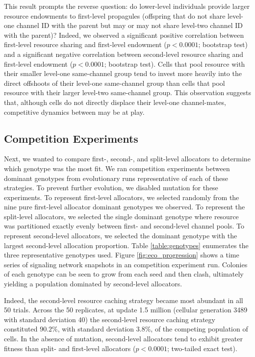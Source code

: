 This result prompts the reverse question: do lower-level individuals provide  larger resource endowments to first-level propagules (offspring that do not share level-one channel ID with the parent but may or may not share level-two channel ID with the parent)?
Indeed, we observed a significant positive correlation between first-level resource sharing and first-level endowment ($p < 0.0001$; bootstrap test) and a significant negative correlation between second-level resource sharing and first-level endowment ($p < 0.0001$; bootstrap test).
Cells that pool resource with their smaller level-one same-channel group tend to invest more heavily into the direct offshoots of their level-one same-channel group than cells that pool resource with their larger level-two same-channel group.
This observation suggests that, although cells do not directly displace their level-one channel-mates, competitive dynamics between may be at play.

\subsection{Competition Experiments}



Next, we wanted to compare first-, second-, and split-level allocators to determine which genotype was the most fit.
We ran competition experiments between dominant genotypes from evolutionary runs representative of each of these strategies.
To prevent further evolution, we disabled mutation for these experiments.
To represent first-level allocators, we selected randomly from the nine pure first-level allocator dominant genotypes we observed.
To represent the split-level allocators, we selected the single dominant genotype where resource was partitioned exactly evenly between first- and second-level channel pools.
To represent second-level allocators, we selected the dominant genotype with the largest second-level allocation proportion.
Table \ref{table:genotypes} enumerates the three representative genotypes used.
Figure \ref{fig:eco_progression} shows a time series of signaling network snapshots in an competition experiment run.
Colonies of each genotype can be seen to grow from each seed and then clash, ultimately yielding a population dominated by second-level allocators.

Indeed, the second-level resource caching strategy became most abundant in all 50 trials.
Across the 50 replicates, at update 1.5 million (cellular generation 3489 with standard deviation 40) the second-level resource caching strategy constituted $90.2 \%$, with standard deviation $3.8 \%$, of the competing population of cells.
In the absence of mutation, second-level allocators tend to exhibit greater fitness than split- and first-level allocators ($p < 0.0001$; two-tailed exact test).


